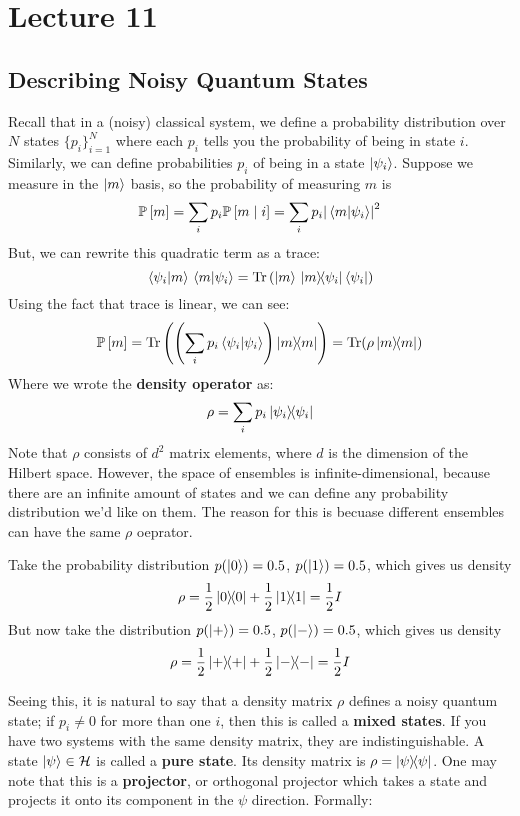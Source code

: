 \section{Lecture 11}

\subsection{Describing Noisy Quantum States}
Recall that in a (noisy) classical system, we define a probability distribution over $N$ states
$\{p_i\}_{i = 1}^N$ where each $p_i$ tells you the probability of being in state $i$. Similarly,
we can define probabilities $p_i$ of being in a state $\ket{\psi_i}$. Suppose we measure in the $\ket{m}$
basis, so the probability of measuring $m$ is
\[ \mathbb{P}\left[ m \right] = \sum_i p_i \mathbb{P}\left[ m \mid i \right] = \sum_i p_i \qty|\braket*{m}{\psi_i}|^2 \]
But, we can rewrite this quadratic term as a trace:
\[ \braket*{\psi_i}{m}\braket*{m}{\psi_i} = \Tr\qty(\ket{m}\ketbra*{m}{\psi_i} \bra{\psi_i}) \]
Using the fact that trace is linear, we can see:
\[ \mathbb{P}\left[ m \right] = \Tr\qty(\qty(\sum_i p_i \braket{\psi_i}{\psi_i}) \ketbra{m}{m}) = \Tr(\rho \ketbra{m}{m})\]
Where we wrote the \textbf{density operator} as:
\[ \rho = \sum_i p_i \ketbra{\psi_i}{\psi_i} \]
Note that $\rho$ consists of $d^2$ matrix elements, where $d$ is the dimension of the Hilbert space.
However, the space of ensembles is infinite-dimensional, because there are an infinite amount of states
and we can define any probability distribution we'd like on them.
The reason for this is becuase different ensembles can have the same $\rho$ oeprator.

\begin{example}
    Take the probability distribution $p(\ket{0}) = 0.5$, $p(\ket{1}) = 0.5$, which gives us density
    \[ \rho = \frac{1}{2} \ketbra{0}{0} + \frac{1}{2} \ketbra{1}{1} = \frac{1}{2} I \]
    But now take the distribution $p(\ket{+}) = 0.5$, $p(\ket{-}) = 0.5$, which gives us density
    \[ \rho = \frac{1}{2} \ketbra{+}{+} + \frac{1}{2} \ketbra{-}{-} = \frac{1}{2} I \]
\end{example}

Seeing this, it is natural to say that a density matrix $\rho$ defines a noisy quantum state; if $p_i \neq 0$ for more than one $i$, then
this is
called a \textbf{mixed states}. If you have two systems
with the same density matrix, they are indistinguishable. A state $\ket{\psi} \in \mathcal{H}$ is called a \textbf{pure state}.
Its density matrix is $\rho = \ketbra{\psi}{\psi}$. One may note that this is a \textbf{projector}, or
orthogonal projector which takes a state and projects it onto its component in the $\psi$ direction. Formally:

